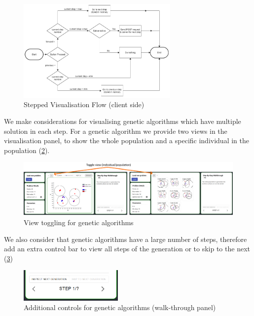 \begin{figure}[H]
    \centering
    \includegraphics[width=0.7\textwidth]{images/stepped_solver_ui/walkthrough_flow.png}
    \caption{Stepped Visualisation Flow (client side)}
    \label{fig:step_sol_logic}
\end{figure}

We make considerations for visualising genetic algorithms which have multiple solution in each step. For a genetic algorithm we provide two views in the visualisation panel, to show the whole population and a specific individual in the population (\cref{fig:step_sol_toggle}). 

\begin{figure}[H]
    \centering
    \includegraphics[width=\textwidth]{images/stepped_solver_ui/stepped_solver_toggle.png}
    \caption{View toggling for genetic algorithms}
    \label{fig:step_sol_toggle}
\end{figure}

We also consider that genetic algorithms have a large number of steps, therefore add an extra control bar to view all steps of the generation or to skip to the next (\cref{fig:step_sol_skip})

\begin{figure}[H]
    \centering
    \includegraphics[width=0.45\textwidth]{images/stepped_solver_ui/stepped_solver_skip.png}
    \caption{Additional controls for genetic algorithms (walk-through panel)}
    \label{fig:step_sol_skip}
\end{figure}
